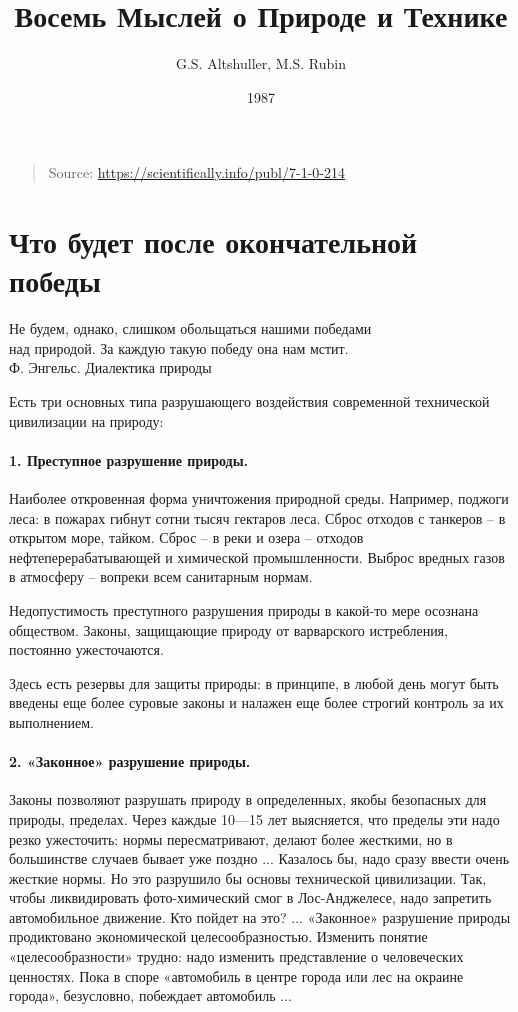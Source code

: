 \documentclass[11pt,a4paper]{article}
\title{Восемь Мыслей о Природе и Технике}
\author{G.S. Altshuller, M.S. Rubin}
\date{1987}
\begin{document}
\maketitle
\begin{quote}
  Source: \url{https://scientifically.info/publ/7-1-0-214}
\end{quote}

\section*{Что будет после окончательной победы}

\begin{flushright}
  Не будем, однако, слишком обольщаться нашими победами\\ над природой.
  За каждую такую победу она нам мстит.\\
  Ф. Энгельс. Диалектика природы
\end{flushright}

Есть три основных типа разрушающего воздействия современной технической
цивилизации на природу:

\paragraph{1. Преступное разрушение природы.}
Наиболее откровенная форма уничтожения природной среды. Например, поджоги
леса: в пожарах гибнут сотни тысяч гектаров леса. Сброс отходов с танкеров --
в открытом море, тайком. Сброс -- в реки и озера -- отходов
нефтеперерабатывающей и химической промышленности. Выброс вредных газов в
атмосферу -- вопреки всем санитарным нормам.

Недопустимость преступного разрушения природы в какой-то мере осознана
обществом.  Законы, защищающие природу от варварского истребления, постоянно
ужесточаются.

Здесь есть резервы для защиты природы: в принципе, в любой день могут быть
введены еще более суровые законы и налажен еще более строгий контроль за их
выполнением.

\paragraph{2. «Законное» разрушение природы.}
Законы позволяют разрушать природу в определенных, якобы безопасных для
природы, пределах. Через каждые 10—15 лет выясняется, что пределы эти надо
резко ужесточить: нормы пересматривают, делают более жесткими, но в
большинстве случаев бывает уже поздно ... Казалось бы, надо сразу ввести очень
жесткие нормы. Но это разрушило бы основы технической цивилизации. Так, чтобы
ликвидировать фото-химический смог в Лос-Анджелесе, надо запретить
автомобильное движение. Кто пойдет на это? ... «Законное» разрушение природы
продиктовано экономической целесообразностью. Изменить понятие
«целесообразности» трудно: надо изменить представление о человеческих
ценностях. Пока в споре «автомобиль в центре города или лес на окраине
города», безусловно, побеждает автомобиль ...
\end{document}
